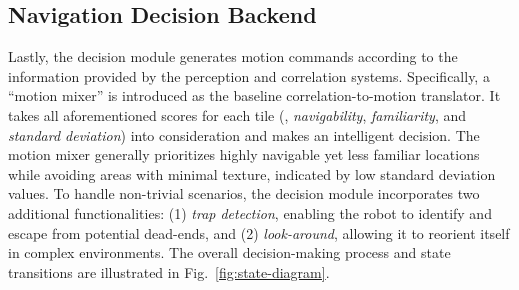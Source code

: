 




\subsection{Navigation Decision Backend}\label{sec:arch/decision}
Lastly, the decision module generates motion commands according to the information provided by the perception and correlation systems. Specifically, a ``motion mixer'' is introduced as the baseline correlation-to-motion translator. It takes all aforementioned scores for each tile (\ie, \textit{navigability},
\textit{familiarity}, and \textit{standard deviation}) into consideration and makes an intelligent decision. The motion mixer generally prioritizes highly navigable yet less familiar locations while avoiding areas with minimal texture, indicated by low standard deviation values. To handle non-trivial scenarios, the decision module incorporates two additional functionalities: (1) \textit{trap detection}, enabling the robot to identify and escape from potential dead-ends, and (2) \textit{look-around}, allowing it to reorient itself in complex environments. The overall decision-making process and state transitions are illustrated in Fig.~\ref{fig:state-diagram}.



